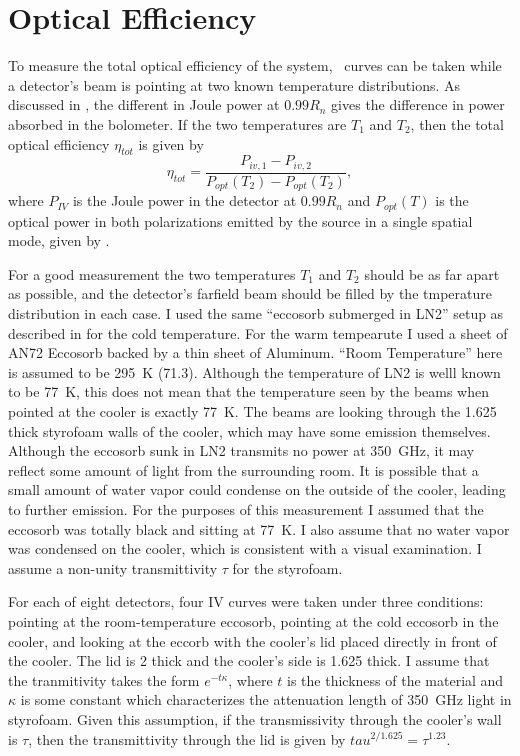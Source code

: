 \section{Optical Efficiency} \label{sec:ch8-opt-eff}

To measure the total optical efficiency of the system, \IV\ curves can be taken while a detector's beam is pointing at two known temperature distributions.
As discussed in , the different in Joule power at $0.99 R_n$ gives the difference in power absorbed in the bolometer.
If the two temperatures are $T_1$ and $T_2$, then the total optical efficiency $\eta_{tot}$ is given by
\begin{equation}
  \eta_{tot} = \frac{P_{iv,1} - P_{iv,2}}{P_{opt}(T_2) - P_{opt}(T_2)},
\end{equation}
where $P_{IV}$ is the Joule power in the detector at $0.99 R_n$ and $P_{opt}(T)$ is the optical power in both polarizations emitted by the source in a single spatial mode, given by .

For a good measurement the two temperatures $T_1$ and $T_2$ should be as far apart as possible, and the detector's farfield beam should be filled by the tmperature distribution in each case.
I used the same ``eccosorb submerged in LN2'' setup as described in  for the cold temperature.
For the warm tempearute I used a sheet of AN72 Eccosorb backed by a thin sheet of Aluminum.
``Room Temperature'' here is assumed to be \SI{295}{\kelvin} (\SI{71.3}{\fahrenheit}).
Although the temperature of LN2 is welll known to be \SI{77}{\kelvin}, this does not mean that the temperature seen by the beams when pointed at the cooler is exactly \SI{77}{\kelvin}.
The beams are looking through the \SI{1.625}{\in} thick styrofoam walls of the cooler, which may have some emission themselves.
Although the eccosorb sunk in LN2 transmits no power at \SI{350}{\GHz}, it may reflect some amount of light from the surrounding room.
It is possible that a small amount of water vapor could condense on the outside of the cooler, leading to further emission.
For the purposes of this measurement I assumed that the eccosorb was totally black and sitting at \SI{77}{\kelvin}.
I also assume that no water vapor was condensed on the cooler, which is consistent with a visual examination.
I assume a non-unity transmittivity $\tau$ for the styrofoam.

For each of eight detectors, four IV curves were taken under three conditions: pointing at the room-temperature eccosorb, pointing at the cold eccosorb in the cooler, and looking at the eccorb with the cooler's lid placed directly in front of the cooler.
The lid is \SI{2}{\in} thick and the cooler's side is \SI{1.625}{\in} thick.
I assume that the tranmitivity takes the form $e^{-t \kappa}$, where $t$ is the thickness of the material and $\kappa$ is some constant which characterizes the attenuation length of \SI{350}{\GHz} light in styrofoam.
Given this assumption, if the transmissivity through the cooler's wall is $\tau$, then the transmittivity through the lid is given by $tau^{2/1.625} = \tau^{1.23}$.

